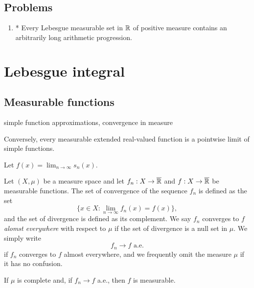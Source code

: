 \documentclass{../../large}
\begin{document}
\begin{prb}
	
\end{prb}


\section*{Problems}
\begin{enumerate}
\item* Every Lebesgue measurable set in $\mathbb{R}$ of positive measure contains an arbitrarily long arithmetic progression.
\end{enumerate}

















\chapter{Lebesgue integral}



\section{Measurable functions}

simple function approximations, convergence in measure

\begin{prb}

Conversely, every measurable extended real-valued function is a pointwise limit of simple functions.

\end{prb}
\begin{pf}
Let $f(x)=\lim_{n\to\infty}s_n(x)$.

\end{pf}



\begin{prb}
Let $(X,\mu)$ be a measure space and let $f_n:X\to\overline{\mathbb{R}}$ and $f:X\to\overline{\mathbb{R}}$ be measurable functions.
The set of convergence of the sequence $f_n$ is defined as the set
\[\{x\in X:\lim_{n\to\infty}f_n(x)=f(x)\},\]
and the set of divergence is defined as its complement.
We say $f_n$ converges to $f$ \emph{alomst everywhere} with respect to $\mu$ if the set of divergence is a null set in $\mu$.
We simply write
\[f_n\to f\text{ a.e.}\]
if $f_n$ converges to $f$ almost everywhere, and we frequently omit the measure $\mu$ if it has no confusion.
\begin{parts}
\item If $\mu$ is complete and, if $f_n\to f$ a.e., then $f$ is measurable.
\end{parts}
\end{prb}
\end{document}
